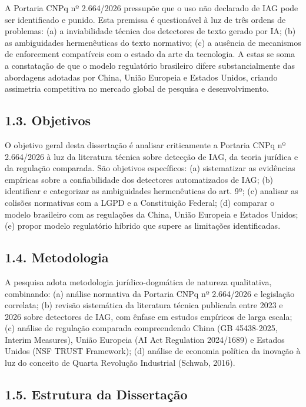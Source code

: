 \documentclass[
  12pt,
  a4paper,
  brazil,
  twoside
]{report}
\begin{document}
A Portaria CNPq nº 2.664/2026 pressupõe que o uso não declarado de IAG
pode ser identificado e punido. Esta premissa é questionável à luz de
três ordens de problemas: (a) a inviabilidade técnica dos detectores de
texto gerado por IA; (b) as ambiguidades hermenêuticas do texto
normativo; (c) a ausência de mecanismos de enforcement compatíveis com o
estado da arte da tecnologia. A estas se soma a constatação de que o
modelo regulatório brasileiro difere substancialmente das abordagens
adotadas por China, União Europeia e Estados Unidos, criando assimetria
competitiva no mercado global de pesquisa e desenvolvimento.

\subsection{1.3. Objetivos}\label{objetivos}

O objetivo geral desta dissertação é analisar criticamente a Portaria
CNPq nº 2.664/2026 à luz da literatura técnica sobre detecção de IAG, da
teoria jurídica e da regulação comparada. São objetivos específicos: (a)
sistematizar as evidências empíricas sobre a confiabilidade dos
detectores automatizados de IAG; (b) identificar e categorizar as
ambiguidades hermenêuticas do art. 9º; (c) analisar as colisões
normativas com a LGPD e a Constituição Federal; (d) comparar o modelo
brasileiro com as regulações da China, União Europeia e Estados Unidos;
(e) propor modelo regulatório híbrido que supere as limitações
identificadas.

\subsection{1.4. Metodologia}\label{metodologia}

A pesquisa adota metodologia jurídico-dogmática de natureza qualitativa,
combinando: (a) análise normativa da Portaria CNPq nº 2.664/2026 e
legislação correlata; (b) revisão sistemática da literatura técnica
publicada entre 2023 e 2026 sobre detectores de IAG, com ênfase em
estudos empíricos de larga escala; (c) análise de regulação comparada
compreendendo China (GB 45438-2025, Interim Measures), União Europeia
(AI Act Regulation 2024/1689) e Estados Unidos (NSF TRUST Framework);
(d) análise de economia política da inovação à luz do conceito de Quarta
Revolução Industrial (Schwab, 2016).

\subsection{1.5. Estrutura da
Dissertação}\label{estrutura-da-dissertauxe7uxe3o}
\end{document}
